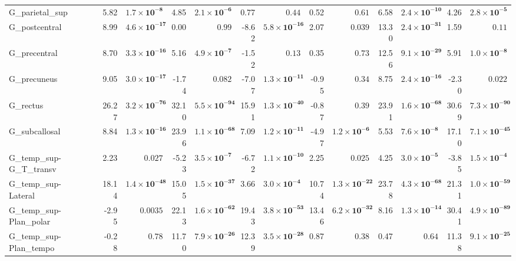 {\begin{longtable}{llrrrrrrrrrrrr}
G\_parietal\_sup &  & 5.82 & $\mathbf{1.7{\times}10^{-8}}$ & 4.85 & $\mathbf{2.1{\times}10^{-6}}$ & 0.77 & $0.44$ & 0.52 & $0.61$ & 6.58 & $\mathbf{2.4{\times}10^{-10}}$ & 4.26 & $\mathbf{2.8{\times}10^{-5}}$ \\
G\_postcentral &  & 8.99 & $\mathbf{4.6{\times}10^{-17}}$ & 0.00 & $0.99$ & -8.62 & $\mathbf{5.8{\times}10^{-16}}$ & 2.07 & $0.039$ & 13.30 & $\mathbf{2.4{\times}10^{-31}}$ & 1.59 & $0.11$ \\
G\_precentral &  & 8.70 & $\mathbf{3.3{\times}10^{-16}}$ & 5.16 & $\mathbf{4.9{\times}10^{-7}}$ & -1.52 & $0.13$ & 0.35 & $0.73$ & 12.56 & $\mathbf{9.1{\times}10^{-29}}$ & 5.91 & $\mathbf{1.0{\times}10^{-8}}$ \\
G\_precuneus &  & 9.05 & $\mathbf{3.0{\times}10^{-17}}$ & -1.74 & $0.082$ & -7.07 & $\mathbf{1.3{\times}10^{-11}}$ & -0.95 & $0.34$ & 8.75 & $\mathbf{2.4{\times}10^{-16}}$ & -2.30 & $0.022$ \\
G\_rectus &  & 26.27 & $\mathbf{3.2{\times}10^{-76}}$ & 32.10 & $\mathbf{5.5{\times}10^{-94}}$ & 15.91 & $\mathbf{1.3{\times}10^{-40}}$ & -0.87 & $0.39$ & 23.91 & $\mathbf{1.6{\times}10^{-68}}$ & 30.69 & $\mathbf{7.3{\times}10^{-90}}$ \\
G\_subcallosal &  & 8.84 & $\mathbf{1.3{\times}10^{-16}}$ & 23.96 & $\mathbf{1.1{\times}10^{-68}}$ & 7.09 & $\mathbf{1.2{\times}10^{-11}}$ & -4.97 & $\mathbf{1.2{\times}10^{-6}}$ & 5.53 & $\mathbf{7.6{\times}10^{-8}}$ & 17.10 & $\mathbf{7.1{\times}10^{-45}}$ \\
G\_temp\_sup-G\_T\_transv &  & 2.23 & $0.027$ & -5.23 & $\mathbf{3.5{\times}10^{-7}}$ & -6.72 & $\mathbf{1.1{\times}10^{-10}}$ & 2.25 & $0.025$ & 4.25 & $\mathbf{3.0{\times}10^{-5}}$ & -3.85 & $\mathbf{1.5{\times}10^{-4}}$ \\
G\_temp\_sup-Lateral &  & 18.14 & $\mathbf{1.4{\times}10^{-48}}$ & 15.05 & $\mathbf{1.5{\times}10^{-37}}$ & 3.66 & $\mathbf{3.0{\times}10^{-4}}$ & 10.74 & $\mathbf{1.3{\times}10^{-22}}$ & 23.78 & $\mathbf{4.3{\times}10^{-68}}$ & 21.31 & $\mathbf{1.0{\times}10^{-59}}$ \\
G\_temp\_sup-Plan\_polar &  & -2.95 & $0.0035$ & 22.13 & $\mathbf{1.6{\times}10^{-62}}$ & 19.43 & $\mathbf{3.8{\times}10^{-53}}$ & 13.46 & $\mathbf{6.2{\times}10^{-32}}$ & 8.16 & $\mathbf{1.3{\times}10^{-14}}$ & 30.41 & $\mathbf{4.9{\times}10^{-89}}$ \\
G\_temp\_sup-Plan\_tempo &  & -0.28 & $0.78$ & 11.70 & $\mathbf{7.9{\times}10^{-26}}$ & 12.39 & $\mathbf{3.5{\times}10^{-28}}$ & 0.87 & $0.38$ & 0.47 & $0.64$ & 11.38 & $\mathbf{9.1{\times}10^{-25}}$ \\

\end{longtable}}
